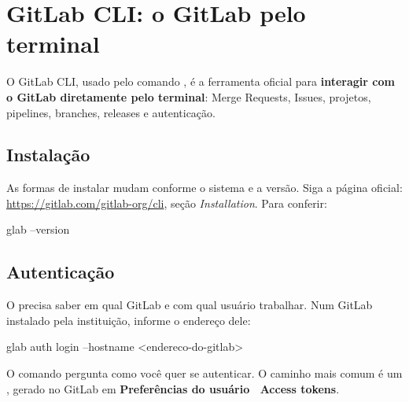 \chapter{GitLab CLI: o GitLab pelo terminal}
\label{cap:glab}

\begin{conceito}
O GitLab CLI, usado pelo comando , é a ferramenta oficial para \textbf{interagir com o GitLab diretamente pelo terminal}: Merge Requests, Issues, projetos, pipelines, branches, releases e autenticação.
\end{conceito}

\begin{center}
\end{center}

\section{Instalação}

As formas de instalar mudam conforme o sistema e a versão. Siga a página oficial: \url{https://gitlab.com/gitlab-org/cli}, seção \emph{Installation}. Para conferir:

\begin{terminal}
glab --version
\end{terminal}

\section{Autenticação}

O  precisa saber em qual GitLab e com qual usuário trabalhar. Num GitLab instalado pela instituição, informe o endereço dele:

\begin{terminal}
glab auth login --hostname <endereco-do-gitlab>
\end{terminal}

O comando pergunta como você quer se autenticar. O caminho mais comum é um , gerado no GitLab em \textbf{Preferências do usuário \faChevronRight\ Access tokens}.

